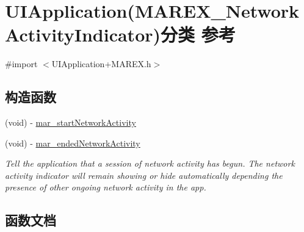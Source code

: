 \hypertarget{category_u_i_application_07_m_a_r_e_x___network_activity_indicator_08}{}\section{U\+I\+Application(M\+A\+R\+E\+X\+\_\+\+Network\+Activity\+Indicator)分类 参考}
\label{category_u_i_application_07_m_a_r_e_x___network_activity_indicator_08}


{\ttfamily \#import $<$U\+I\+Application+\+M\+A\+R\+E\+X.\+h$>$}

\subsection*{构造函数}
\begin{DoxyCompactItemize}
\item 
(void) -\/ \hyperlink{category_u_i_application_07_m_a_r_e_x___network_activity_indicator_08_ab6ec23eb9259c04ae15dd57d644ae229}{mar\+\_\+start\+Network\+Activity}
\item 
(void) -\/ \hyperlink{category_u_i_application_07_m_a_r_e_x___network_activity_indicator_08_a3f8d99766b29b9d99b6d5de656c642ee}{mar\+\_\+ended\+Network\+Activity}
\begin{DoxyCompactList}\small\item\em Tell the application that a session of network activity has begun. The network activity indicator will remain showing or hide automatically depending the presence of other ongoing network activity in the app. \end{DoxyCompactList}\end{DoxyCompactItemize}


\subsection{函数文档}
\mbox{\label{category_u_i_application_07_m_a_r_e_x___network_activity_indicator_08_a3f8d99766b29b9d99b6d5de656c642ee}} 
